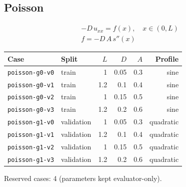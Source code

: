 \documentclass[11pt]{article}
\begin{document}
\subsection{Poisson}
\begin{align*}
-D\,u_{xx} = f(x),\quad x\in(0,L)\\
f = -D\,A\,s''(x)
\end{align*}
\begin{center}\small
\begin{tabular}{llrrrr}
\toprule
Case & Split & $L$ & $D$ & $A$ & Profile \\
\midrule
\texttt{poisson-g0-v0} & train & 1 & 0.05 & 0.3 & sine \\
\texttt{poisson-g0-v1} & train & 1.2 & 0.1 & 0.4 & sine \\
\texttt{poisson-g0-v2} & train & 1 & 0.15 & 0.5 & sine \\
\texttt{poisson-g0-v3} & train & 1.2 & 0.2 & 0.6 & sine \\
\texttt{poisson-g1-v0} & validation & 1 & 0.05 & 0.3 & quadratic \\
\texttt{poisson-g1-v1} & validation & 1.2 & 0.1 & 0.4 & quadratic \\
\texttt{poisson-g1-v2} & validation & 1 & 0.15 & 0.5 & quadratic \\
\texttt{poisson-g1-v3} & validation & 1.2 & 0.2 & 0.6 & quadratic \\
\bottomrule
\end{tabular}
\end{center}
\noindent Reserved cases: 4 (parameters kept evaluator-only).
\end{document}
